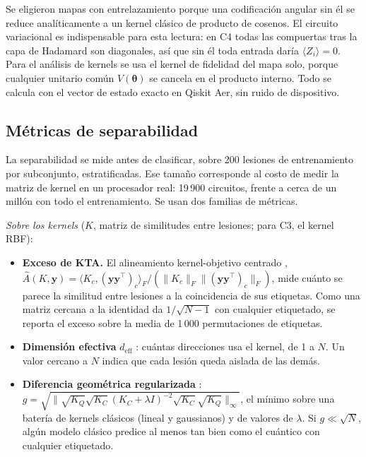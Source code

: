 \documentclass[conference,letterpaper]{IEEEtran}
\begin{document}
Se eligieron mapas con entrelazamiento porque una codificación angular sin él se reduce analíticamente a un kernel clásico de producto de cosenos. El circuito variacional es indispensable para esta lectura: en C4 todas las compuertas tras la capa de Hadamard son diagonales, así que sin él toda entrada daría $\langle Z_i \rangle = 0$. Para el análisis de kernels se usa el kernel de fidelidad del mapa solo, porque cualquier unitario común $V(\boldsymbol{\theta})$ se cancela en el producto interno. Todo se calcula con el vector de estado exacto en Qiskit Aer, sin ruido de dispositivo.

\subsection{Métricas de separabilidad}

La separabilidad se mide antes de clasificar, sobre 200 lesiones de entrenamiento por subconjunto, estratificadas. Ese tamaño corresponde al costo de medir la matriz de kernel en un procesador real: 19\,900 circuitos, frente a cerca de un millón con todo el entrenamiento. Se usan dos familias de métricas.

\textit{Sobre los kernels} ($K$, matriz de similitudes entre lesiones; para C3, el kernel RBF):
\begin{itemize}
  \item \textbf{Exceso de KTA.} El alineamiento kernel-objetivo centrado \cite{Cortes2012}, $\hat{A}(K,\mathbf{y}) = \langle K_c, (\mathbf{y}\mathbf{y}^\top)_c\rangle_F / (\|K_c\|_F \|(\mathbf{y}\mathbf{y}^\top)_c\|_F)$, mide cuánto se parece la similitud entre lesiones a la coincidencia de sus etiquetas. Como una matriz cercana a la identidad da $1/\sqrt{N-1}$ con cualquier etiquetado, se reporta el exceso sobre la media de 1\,000 permutaciones de etiquetas.
  \item \textbf{Dimensión efectiva} $d_{\mathrm{eff}}$ \cite{huang2021power}: cuántas direcciones usa el kernel, de 1 a $N$. Un valor cercano a $N$ indica que cada lesión queda aislada de las demás.
  \item \textbf{Diferencia geométrica regularizada} \cite{huang2021power}: $g = \sqrt{\|\sqrt{K_Q}\sqrt{K_C}(K_C+\lambda I)^{-2}\sqrt{K_C}\sqrt{K_Q}\|_\infty}$, el mínimo sobre una batería de kernels clásicos (lineal y gaussianos) y de valores de $\lambda$. Si $g \ll \sqrt{N}$, algún modelo clásico predice al menos tan bien como el cuántico con cualquier etiquetado.
\end{itemize}
\end{document}
